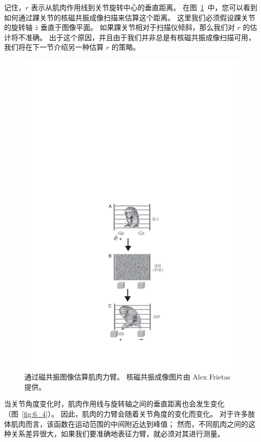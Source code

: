 记住，$r$ 表示从肌肉作用线到关节旋转中心的垂直距离。
在图~\ref{fig:6_3}~中，您可以看到如何通过踝关节的核磁共振成像扫描来估算这个距离。
这里我们必须假设踝关节的旋转轴 $\hat{z}$ 垂直于图像平面。
如果踝关节相对于扫描仪倾斜，那么我们对 $r$ 的估计将不准确。
出于这个原因，并且由于我们并非总是有核磁共振成像扫描可用，我们将在下一节介绍另一种估算 $r$ 的策略。


\begin{figure}[!htb]
	\centering
	\includegraphics[width=0.4\linewidth]{chap6/6_3}
	\caption{通过磁共振图像估算肌肉力臂。
		核磁共振成像图片由 Alex Frietas 提供。 \label{fig:6_3}}
\end{figure}


当关节角度变化时，肌肉作用线与旋转轴之间的垂直距离也会发生变化（图~\ref{fig:6_4}）。
因此，肌肉的力臂会随着关节角度的变化而变化。
对于许多肢体肌肉而言，该函数在运动范围的中间附近达到峰值；
然而，不同肌肉之间的这种关系差异很大，如果我们要准确地表征力臂，就必须对其进行测量。



